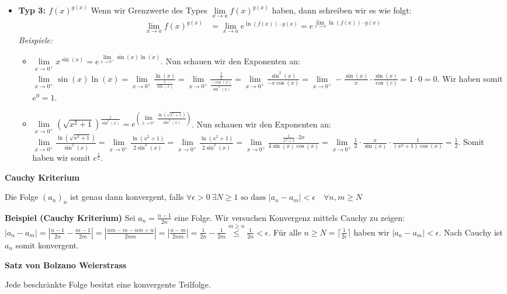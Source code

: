 \documentclass[25pt]{sciposter}
\newcommand{\limx}[1]{\lim\limits_{x \to #1}}
\newenvironment{method}[1]{\begin{mdframed}[backgroundcolor=blue!10,innertopmargin=15pt, innerbottommargin=15pt, nobreak=true]
		\textbf{#1 }
	}
	{ 
	\end{mdframed}
}
\newcommand{\TODO}[1]{\todo[inline]{\Large TODO:  #1}}
\begin{document}
\begin{multicols}{3}
\begin{itemize}
	
	\item \textbf{Typ 3: $f(x)^{g(x)}$} Wenn wir Grenzwerte des Types $ \limx{a} f(x)^{g(x)}$ haben, dann schreiben wir es wie folgt:
	\begin{align*}
		\limx{a} f(x)^{g(x)} &= \limx{a} e^{\ln(f(x))\cdot g(x)} = e^{\limx{a} \ln(f(x))\cdot g(x)}
	\end{align*}
	\textit{Beispiele:}
	\begin{itemize}
		\item $\limx{0^+} x^{\sin(x)} = e^{\limx{0^+} \sin(x)\ln(x)}$. Nun schauen wir den Exponenten an: $\limx{0^+} \sin(x)\ln(x) = \limx{0^+} \frac{\ln(x)}{\frac{1}{\sin(x)}} = \limx{0^+} \frac{\frac{1}{x}}{\frac{-\cos(x)}{\sin^2(x)}} = \limx{0^+} \frac{\sin^2(x)}{- x\cos(x)} = \limx{0^+} -\frac{\sin(x)}{x} \cdot\frac{\sin(x)}{\cos(c)} = 1 \cdot 0 = 0$. Wir haben somit $e^0 = 1$.
		\item $\limx{0^+} \left( \sqrt{x^2 + 1} \right)^{\frac{1}{\sin^2(x)}} = e^{\left(\limx{0^+} \frac{\ln(\sqrt{x^2 + 1})}{\sin^2(x)} \right)}$. Nun schauen wir den Exponenten an: $\limx{0^+} \frac{\ln(\sqrt{x^2 + 1})}{\sin^2(x)} = \limx{0^+} \frac{\ln(x^2 + 1)}{2\sin^2(x)} = \limx{0^+} \frac{\ln(x^2 + 1)}{2\sin^2(x)} = \limx{0^+} \frac{\frac{1}{x^2+1}\cdot 2x}{4\sin(x)\cos(x)} = \limx{0^+} \frac{1}{2}\cdot \frac{x}{\sin(x)} \cdot \frac{1}{(x^2 + 1) \cos(x)} = \frac{1}{2}$. Somit haben wir somit $e^{\frac{1}{2}}$.
	\end{itemize}
\end{itemize}



\begin{method}{Cauchy Kriterium}
	Die Folge $(a_n)_n$ ist genau dann konvergent, falls $\forall  \epsilon > 0 \ \exists N \geq 1 \text{ so dass } |a_n - a_m| < \epsilon \quad \forall n,m \geq N$
\end{method}

\TODO{Beweis von Cauchy}

\textbf{Beispiel (Cauchy Kriterium)}
Sei $a_n = \frac{n-1}{2n}$ eine Folge. Wir versuchen Konvergenz mittels Cauchy zu zeigen:\\
$|a_n - a_m| = |\frac{n-1}{2n} - \frac{m-1}{2m}| = |\frac{nm-m-nm+n}{2nm}| = |\frac{n-m}{2nm}| = \frac{1}{2n} - \frac{1}{2m} \stackrel{m\geq n}{\leq} \frac{1}{2n} < \epsilon$. Für alle $n \geq N = \lceil \frac{1}{2\epsilon} \rceil$ haben wir $|a_n - a_m| < \epsilon$. Nach Cauchy ist $a_n$ somit konvergent.

\begin{method}{Satz von Bolzano Weierstrass}
	Jede beschränkte Folge besitzt eine konvergente Teilfolge.
\end{method}



\end{multicols}
\end{document}
